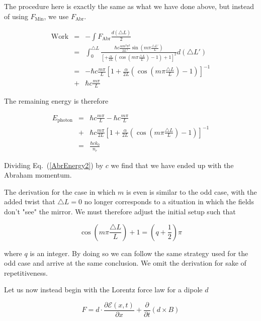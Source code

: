 \documentclass[twocolumn,english,pra,aps,superscriptaddress,floatfix]{revtex4-1}
\begin{document}
The procedure here is exactly the same as what we have done above, but instead of using $F_{\mathrm{Min}}$, we use $F_{\mathrm{Abr}}$.


\begin{eqnarray}
\mathrm{Work}&=&-\int F_{\mathrm{Abr}}\frac{d\left(\triangle L\right)}{2}\nonumber \\
&=&\int_{0}^{\triangle L}\frac{\hbar c\frac{\alpha m^{2}\pi^{2}}{2L^{3}}\sin(m\pi\frac{\triangle L'}{L})}{\left[+\frac{\alpha}{2L}\left(\cos(m\pi\frac{\triangle L}{L})-1\right)+1\right]^{2}}d\left(\triangle L'\right) \nonumber \\
&=&-\hbar c\frac{m\pi}{L}\left[1+\frac{\alpha}{2L}\left(\cos(m\pi\frac{\triangle L}{L})-1\right)\right]^{-1} \nonumber \\
&+&\hbar c\frac{m\pi}{L}
\label{AbrEnergy1}
\end{eqnarray}


The remaining energy is therefore

\begin{eqnarray}
E_{\mathrm{photon}}&=&\hbar c\frac{m\pi}{L} -\hbar c\frac{m\pi}{L}\nonumber \\
&+&\hbar c\frac{m\pi}{2L}\left[1+\frac{\alpha}{2L}\left(\cos(m\pi\frac{\triangle L}{L})-1\right)\right]^{-1}\nonumber \\
&=&\frac{\hbar ck_{0}}{n_{r}}
\label{AbrEnergy2}
\end{eqnarray}


Dividing Eq.\ (\ref{AbrEnergy2}) by $c$ we find that we have ended up with the Abraham momentum.

The derivation for the case in which $m$ is even is similar to the odd case, with the added twist that $\triangle L=0$ no longer corresponds to a situation in which the fields don't "see" the mirror.  We must therefore adjust the initial setup such that

\begin{equation}
\cos(m\pi\frac{\triangle L}{L})+1=(q+\frac{1}{2})\pi
\label{wavenumbereqn}
\end{equation}

where $q$ is an integer.  By doing so we can follow the same strategy used for the odd case and arrive at the same conclusion.  We omit the derivation for sake of repetitiveness.

Let us now instead begin with the Lorentz force law for a dipole $d$ \cite{Hinds}

\begin{equation}
F = d \cdot \frac{\partial \mathcal{E}(x,t)}{\partial x} + \frac{\partial}{\partial t} \left(d \times B \right)
\label{hindsforce}
\end{equation}
\end{document}

